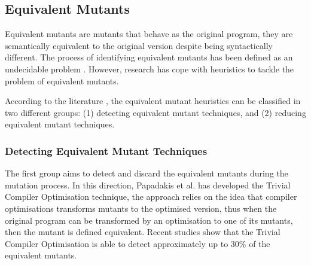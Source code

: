 
\subsection{Equivalent Mutants}
\label{sec:opt:equivalent}

Equivalent mutants are mutants that behave as the original program, they are semantically equivalent to the original version despite being syntactically different. The process of identifying equivalent mutants has been defined as an undecidable problem \cite{madeyski2013overcoming}. However, research has cope with heuristics to tackle the problem of equivalent mutants.

According to the literature \cite{madeyski2013overcoming}, the equivalent mutant heuristics can be classified in two different groups: (1) detecting equivalent mutant techniques, and (2) reducing equivalent mutant techniques.

\subsubsection{Detecting Equivalent Mutant Techniques}

The first group aims to detect and discard the equivalent mutants during the mutation process. In this direction, Papadakis et al. \cite{papadakis2015trivial, kintis2017detecting,papadakis2019mutation} has developed the Trivial Compiler Optimisation technique, the approach relies on the idea that compiler optimisations transforms mutants to the optimised version, thus when the original program can be transformed by an optimisation to one of its mutants, then the mutant is defined equivalent.
Recent studies \cite{papadakis2015trivial} show that the Trivial Compiler Optimisation is able to detect approximately up to 30\% of the equivalent mutants.

